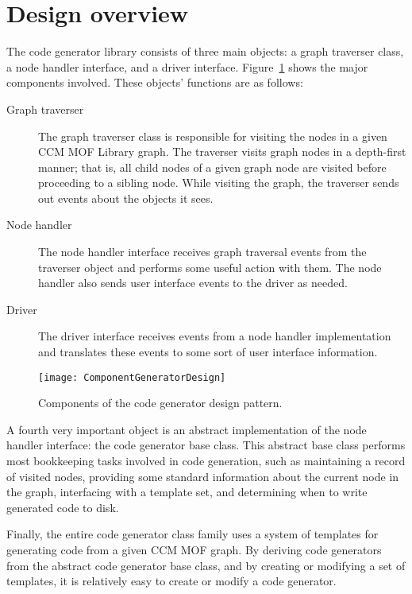 \section{Design overview}

The code generator library consists of three main objects: a graph traverser
class, a node handler interface, and a driver interface.
Figure~\ref{fig:component-generator-design} shows the major components involved.
These objects' functions are as follows:

\begin{description}
\item [Graph traverser] The graph traverser class is responsible for visiting
      the nodes in a given CCM MOF Library graph. The traverser visits graph
      nodes in a depth-first manner; that is, all child nodes of a given graph
      node are visited before proceeding to a sibling node. While visiting the
      graph, the traverser sends out events about the objects it sees.
\item [Node handler] The node handler interface receives graph traversal events
      from the traverser object and performs some useful action with them. The
      node handler also sends user interface events to the driver as needed.
\item [Driver] The driver interface receives events from a node handler
      implementation and translates these events to some sort of user interface
      information.
\end{description}

\begin{figure}
\centering
\texttt{[image: ComponentGeneratorDesign]}
\caption{Components of the code generator design pattern.}
\label{fig:component-generator-design}
\end{figure}

A fourth very important object is an abstract implementation of the node handler
interface: the code generator base class. This abstract base class performs most
bookkeeping tasks involved in code generation, such as maintaining a record of
visited nodes, providing some standard information about the current node in the
graph, interfacing with a template set, and determining when to write generated
code to disk.

Finally, the entire code generator class family uses a system of templates for
generating code from a given CCM MOF graph. By deriving code generators from the
abstract code generator base class, and by creating or modifying a set of
templates, it is relatively easy to create or modify a code generator.

